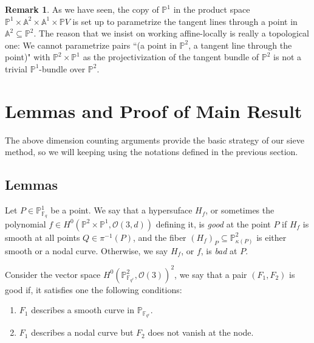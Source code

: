 \documentclass[12pt]{article}
\theoremstyle{plain}
\theoremstyle{definition}
\newtheorem{remark}[equation]{Remark}
\newcommand{\IA}{\mathbb{A}}
\newcommand{\IF}{\mathbb{F}}
\newcommand{\IP}{\mathbb{P}}
\newcommand{\sO}{\mathcal{O}}
\newcommand{\<}{\langle}
\renewcommand{\>}{\rangle}
\begin{document}
\begin{remark}
As we have seen, the copy of $\IP^1$ in the product space $\IP^1 \times \IA^2 \times \IA^1 \times \IP V$ is set up to parametrize the tangent lines through a point in $\IA^2 \subseteq \IP^2$. The reason that we insist on working affine-locally is really a topological one: We cannot parametrize pairs ``(a point in $\IP^2$, a tangent line through the point)" with $\IP^2 \times \IP^1$ as the projectivization of the tangent bundle of $\IP^2$ is not a trivial $\IP^1$-bundle over $\IP^2$. 
\end{remark}

\section{Lemmas and Proof of Main Result}

The above dimension counting arguments provide the basic strategy of our sieve method, so we will keeping using the notations defined in the previous section. 
\subsection{Lemmas}
Let $P \in \IP^1_{\IF_q}$ be a point. We say that a hypersuface $H_f$, or sometimes the polynomial $f \in H^0(\IP^2 \times \IP^1, \sO(3, d))$ defining it, is \textit{good} at the point $P$ if $H_f$ is smooth at all points $Q \in \pi^{-1}(P)$, and the fiber $(H_f)_P \subseteq \IP^2_{\kappa(P)}$ is either smooth or a nodal curve. Otherwise, we say $H_f$, or $f$, is \textit{bad} at $P$.  

Consider the vector space $H^0(\IP^2_{\IF_{q^e}}, \sO(3))^2$, we say that a pair $(F_1, F_2)$ is good if, it satisfies one the following conditions:
\begin{enumerate}
\item $F_1$ describes a smooth curve in $\IP_{\IF_{q^e}}$.
\item $F_1$ describes a nodal curve but $F_2$ does not vanish at the node.
\end{enumerate}  
\end{document}
